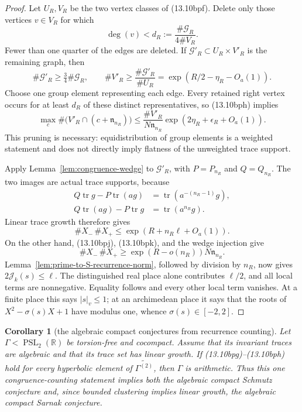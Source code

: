 \documentclass[11pt,reqno]{amsart}
\newtheorem{corollary}[theorem]{Corollary}
\theoremstyle{definition}
\theoremstyle{remark}
\newcommand{\R}{\mathbb R}
\newcommand{\Tr}{\operatorname{tr}}
\newcommand{\PSL}{\operatorname{PSL}}
\begin{document}
\begin{proof}
Let \(U_R,V_R\) be the two vertex classes of (13.10bpf).  Delete only those
vertices \(v\in V_R\) for which
\[
 \deg(v)<d_R:=\frac{\#\mathcal G_R}{4\#V_R}.
\]
Fewer than one quarter of the edges are deleted.  If
\(\mathcal G'_R\subset U_R\times V'_R\) is the remaining graph, then
\[
 \#\mathcal G'_R\ge\tfrac34\#\mathcal G_R,
 \qquad
 \#V'_R\ge
 \frac{\#\mathcal G'_R}{\#U_R}
 =\exp(R/2-\eta_R-O_a(1)).
\tag{13.10bpj}
\]
Choose one group element representing each edge.  Every retained right
vertex occurs for at least \(d_R\) of these distinct representatives, so
(13.10bph) implies
\[
 \max_c\#\bigl(V'_R\cap(c+\mathfrak n_{n_R})\bigr)
 \le
 \frac{\#V'_R}{N\mathfrak n_{n_R}}
 \exp(2\eta_R+\epsilon_R+O_a(1)).
\tag{13.10bpk}
\]
This pruning is necessary: equidistribution of group elements is a weighted
statement and does not directly imply flatness of the unweighted trace
support.

Apply Lemma~\ref{lem:congruence-wedge} to \(\mathcal G'_R\), with
\(P=P_{n_R}\) and \(Q=Q_{n_R}\).  The two images are actual trace
supports, because
\[
 \begin{aligned}
 Q\Tr g-P\Tr(ag)&=\Tr(a^{-(n_R-1)}g),\\
 Q\Tr(ag)-P\Tr g&=\Tr(a^{n_R}g).
 \end{aligned}
\tag{13.10bpl}
\]
Linear trace growth therefore gives
\[
 \#X_-\,\#X_+\le\exp(R+n_R\ell+O_a(1)).
\tag{13.10bpm}
\]
On the other hand, (13.10bpj), (13.10bpk), and the wedge injection give
\[
 \#X_-\,\#X_+
 \ge \exp(R-o(n_R))N\mathfrak n_{n_R}.
\tag{13.10bpn}
\]
Lemma~\ref{lem:prime-to-S-recurrence-norm}, followed by division by \(n_R\),
now gives \(2\mathcal J_k(s)\le\ell\).  The distinguished real place alone
contributes \(\ell/2\), and all local terms are nonnegative.  Equality
follows and every other local term vanishes.  At a finite place this says
\(|s|_v\le1\); at an archimedean place it says that the roots of
\(X^2-\sigma(s)X+1\) have modulus one, whence
\(\sigma(s)\in[-2,2]\).
\end{proof}

\begin{corollary}[the algebraic compact conjectures from recurrence counting]
\label{cor:algebraic-compact-from-congruence}
Let \(\Gamma<\PSL_2(\R)\) be torsion-free and cocompact.  Assume that its
invariant traces are algebraic and that its trace set has linear growth.
If (13.10bpg)--(13.10bph) hold for every hyperbolic element of
\(\widetilde{\Gamma^{(2)}}\), then \(\Gamma\) is arithmetic.  Thus this one
congruence-counting statement implies both the algebraic compact Schmutz
conjecture and, since bounded clustering implies linear growth, the
algebraic compact Sarnak conjecture.
\end{corollary}
\end{document}
